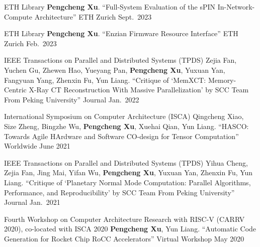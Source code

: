 


\begin{cventries}

  \cventry
    {ETH Library}
    {{\normalfont \textbf{Pengcheng Xu}. ``Full-System Evaluation of the sPIN In-Network-Compute Architecture''}}
    {ETH Zurich} %
    {Sept.\ 2023} %
    {}

  \cventry
    {ETH Library}
    {{\normalfont \textbf{Pengcheng Xu}. ``Enzian Firmware Resource Interface''}}
    {ETH Zurich} %
    {Feb.\ 2023} %
    {}

  \cventry
    {IEEE Transactions on Parallel and Distributed Systems (TPDS)}
    {{\normalfont Zejia Fan, Yuchen Gu, Zhewen Hao, Yueyang Pan, \textbf{Pengcheng Xu}, Yuxuan Yan, Fangyuan Yang, Zhenxin Fu, Yun Liang. ``Critique of `MemXCT: Memory-Centric X-Ray CT Reconstruction With Massive Parallelization' by SCC Team From Peking University''}}
    {Journal} %
    {Jan.\ 2022} %
    {}

  \cventry
    {International Symposium on Computer Architecture (ISCA)}
    {{\normalfont Qingcheng Xiao, Size Zheng, Bingzhe Wu, \textbf{Pengcheng Xu}, Xuehai Qian, Yun Liang. ``HASCO: Towards Agile HArdware and Software CO-design for Tensor Computation''}}
    {Worldwide} %
    {June 2021} %
    {}

  \cventry
    {IEEE Transactions on Parallel and Distributed Systems (TPDS)}
    {{\normalfont Yihua Cheng, Zejia Fan, Jing Mai, Yifan Wu, \textbf{Pengcheng Xu}, Yuxuan Yan, Zhenxin Fu, Yun Liang. ``Critique of `Planetary Normal Mode Computation: Parallel Algorithms, Performance, and Reproducibility' by SCC Team From Peking University''}}
    {Journal} %
    {Jan.\ 2021} %
    {}

  \cventry
    {Fourth Workshop on Computer Architecture Research with RISC-V (CARRV 2020), co-located with ISCA 2020} %
    {{\normalfont \textbf{Pengcheng Xu}, Yun Liang. ``Automatic Code Generation for Rocket Chip RoCC Accelerators''}} %
    {Virtual Workshop} %
    {May 2020} %
    {}
\end{cventries}
